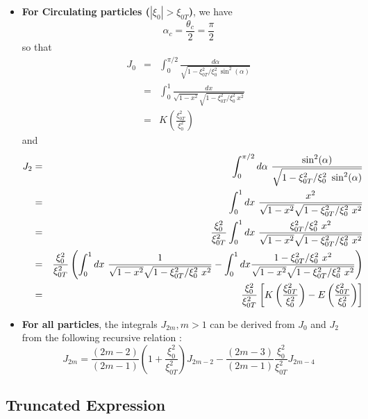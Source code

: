 \begin{itemize}
\item  \textbf{For Circulating particles ($|\xi _{0}|>\xi _{0T}$)}, we have
\begin{equation}
\alpha _{c}=\frac{\theta _{c}}{2}=\frac{\pi }{2}
\end{equation}
so that
\begin{eqnarray}
J_{0} &=&\int_{0}^{\pi /2}\frac{d\alpha }{\sqrt{1-\xi _{0T}^{2}/\xi
_{0}^{2}\ \sin ^{2}(\alpha )}}  \nonumber \\
&=&\int_{0}^{1}\frac{dx}{\sqrt{1-x^{2}}\sqrt{1-\xi _{0T}^{2}/\xi _{0}^{2}\
x^{2}}}  \nonumber \\
&=&K\left( \frac{\xi _{0T}^{2}}{\xi _{0}^{2}}\right)
\end{eqnarray}
and
\begin{eqnarray}
J_{2} &=&\int_{0}^{\pi /2}d\alpha \ \frac{\sin ^{2}(\alpha )}{\sqrt{1-\xi
_{0T}^{2}/\xi _{0}^{2}\ \sin ^{2}(\alpha )}}  \nonumber \\
&=&\int_{0}^{1}dx\ \frac{x^{2}}{\sqrt{1-x^{2}}\sqrt{1-\xi _{0T}^{2}/\xi
_{0}^{2}\ x^{2}}}  \nonumber \\
&=&\frac{\xi _{0}^{2}}{\xi _{0T}^{2}}\int_{0}^{1}dx\ \frac{\xi _{0T}^{2}/\xi
_{0}^{2}\ x^{2}}{\sqrt{1-x^{2}}\sqrt{1-\xi _{0T}^{2}/\xi _{0}^{2}\ x^{2}}}
\nonumber \\
&=&\frac{\xi _{0}^{2}}{\xi _{0T}^{2}}\left( \int_{0}^{1}dx\ \frac{1}{\sqrt{%
1-x^{2}}\sqrt{1-\xi _{0T}^{2}/\xi _{0}^{2}\ x^{2}}}-\int_{0}^{1}dx\frac{%
1-\xi _{0T}^{2}/\xi _{0}^{2}\ x^{2}}{\sqrt{1-x^{2}}\sqrt{1-\xi _{0T}^{2}/\xi
_{0}^{2}\ x^{2}}}\right)   \nonumber \\
&=&\frac{\xi _{0}^{2}}{\xi _{0T}^{2}}\left[ K\left( \frac{\xi _{0T}^{2}}{\xi
_{0}^{2}}\right) -E\left( \frac{\xi _{0T}^{2}}{\xi _{0}^{2}}\right) \right]
\end{eqnarray}

\item  \textbf{For all particles}, the integrals $J_{2m},m>1$ can be derived
from $J_{0}$ and $J_{2}$ from the following recursive relation \cite{kil86}:
\begin{equation}
J_{2m}=\frac{(2m-2)}{(2m-1)}\left( 1+\frac{\xi _{0}^{2}}{\xi _{0T}^{2}}%
\right) J_{2m-2}-\frac{(2m-3)}{(2m-1)}\frac{\xi _{0}^{2}}{\xi _{0T}^{2}}%
J_{2m-4}  \label{J2m}
\end{equation}
\end{itemize}

\subsection{Truncated Expression}

